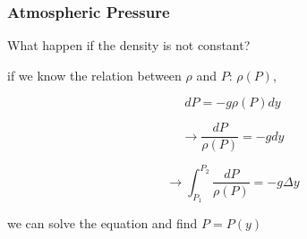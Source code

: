 \documentclass[]{beamer}
\begin{document}
\begin{frame}
  \frametitle{Atmospheric Pressure}
  What happen if the density is not constant?
  
  \pause
  
  \vspace{3mm}
  
  if we know the relation between $\rho$ and $P$: $ \rho(P)$,
  
  \pause
  
\begin{equation*}
  dP=-g\rho(P)dy 
\end{equation*}


\begin{equation*}
  \rightarrow \frac{dP}{\rho(P)}=-g dy
\end{equation*}


\begin{equation*}
  \rightarrow \int^{P_2}_{P_1} \frac{dP}{\rho(P)}=-g \Delta y
\end{equation*}

  
  \pause
  we can solve the equation and find $P=P(y)$
  \end{frame}
  
\end{document}
